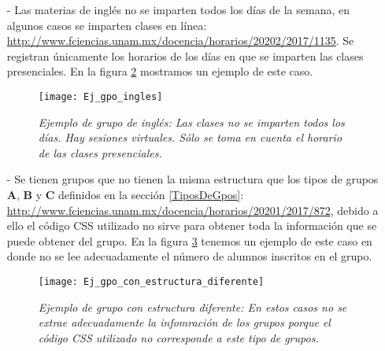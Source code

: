 \begin{itemize}
En la figura \ref{horariosMultiples} tenemos un ejemplo de este caso en donde el profesor imparte su clase los lunes, miércoles y viernes de 13-14hrs en el salón O215, hay una ayudantía los martes y jueves de 13-14hrs en el salón O215 y otra ayudantía los martes de 11-13hrs en el salón 304 (Yelizcalli). Se considera que esta materia inicia a las 13hrs y se imparte en el salón O215.
  
\begin{figure}[H]
\centering
\texttt{[image: Ej\_gpo\_horarios\_multiples]} %
\caption[\textit{Ejemplo de grupo con horarios múltiples}]{\textit{Ejemplo de grupo con horarios múltiples: En estos grupos sólo se toman en cuenta los horarios y salones en los que los profesores imparten clase.}}\label{horariosMultiples}
\end{figure}
  
\item[-] Las materias de inglés no se imparten todos los días de la semana, en algunos casos se imparten clases en línea: \url{http://www.fciencias.unam.mx/docencia/horarios/20202/2017/1135}. Se registran únicamente los horarios de los días en que se imparten las clases presenciales. En la figura \ref{casoIngles} mostramos un ejemplo de este caso.

\begin{figure}[H]
\centering
\texttt{[image: Ej\_gpo\_ingles]} %
\caption[\textit{Ejemplo de grupo de inglés}]{\textit{Ejemplo de grupo de inglés: Las clases no se imparten todos los días. Hay sesiones virtuales. Sólo se toma en cuenta el horario de las clases presenciales.}}\label{casoIngles}
\end{figure}

\item[-] Se tienen grupos que no tienen la misma estructura que los tipos de grupos \textbf{A}, \textbf{B} y \textbf{C} definidos en la sección \ref{TiposDeGpos}: \url{http://www.fciencias.unam.mx/docencia/horarios/20201/2017/872}, debido a ello el código CSS utilizado no sirve para obtener toda la información que se puede obtener del grupo. En la figura \ref{GpoEstructuraDiferente} tenemos un ejemplo de este caso en donde no se lee adecuadamente el número de alumnos inscritos en el grupo.

\begin{figure}[H]
\centering
\texttt{[image: Ej\_gpo\_con\_estructura\_diferente]} %
\caption[\textit{Ejemplo de grupo con estructura diferente}]{\textit{Ejemplo de grupo con estructura diferente: En estos casos no se extrae adecuadamente la infomración de los grupos porque el código CSS utilizado no corresponde a este tipo de grupos.}}\label{GpoEstructuraDiferente}
\end{figure}

\end{itemize}